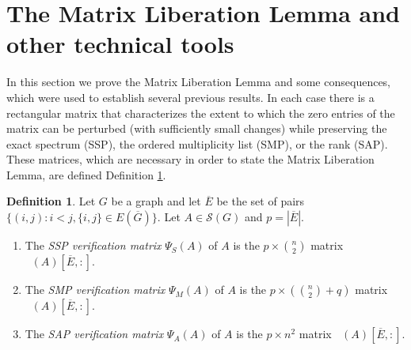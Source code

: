 \documentclass[11pt]{article}
\def\red{\color{red}}
\theoremstyle{definition}
\theoremstyle{definition}
\newtheorem{defn}[thm]{Definition}
\theoremstyle{definition}
\DeclareMathOperator{\TSS}{TS_S}
\DeclareMathOperator{\TSM}{TS_M}
\DeclareMathOperator{\TSA}{TS_A}
\newcommand{\Ec}{\overline{E}}
\newcommand{\verA}{\Psi_A}
\newcommand{\verM}{\Psi_M}
\newcommand{\verS}{\Psi_S}
\newcommand{\Gc}{\overline{G}}
\newcommand{\x}{\times}
\newcommand{\mptn}{\mathcal{S}} %
\newcommand{\vect}{\operatorname{vec}}
\begin{document}
\section{The Matrix Liberation Lemma and other technical tools}\label{sMLL}
In this section we prove the Matrix Liberation Lemma and some consequences, which were used to establish several previous results.  In each case there is a rectangular matrix that characterizes the extent to which   the {zero} entries of the matrix can be perturbed  (with sufficiently small changes) 
while preserving the exact spectrum (SSP),  the ordered multiplicity list  (SMP), or  the rank (SAP).  These matrices, which are necessary in order to state the Matrix Liberation Lemma, are defined Definition \ref{vermtxdef}.  %

\begin{defn}\label{vermtxdef}  Let $G$ be a graph and let $\overline{E}$ be the set of pairs $\{(i,j):i<j,\{i,j\}\in E(\overline{G})\}$.  Let $A\in\mptn(G)$ and $p=|\overline{E}|$.  
\begin{enumerate}
\item The {\em SSP verification matrix} $\verS(A)$ of $A$ is the $p\times\binom{n}{2}$ matrix $\TSS(A)[\Ec,:]$.
\item The {\em SMP verification matrix} $\verM(A)$ of $A$ is the $p\times\left(\binom{n}{2}+q\right)$ matrix $\TSM(A)[\Ec,:]$.
\item The {\em SAP verification matrix} $\verA(A)$ of $A$ is the $p\times n^2$ matrix $\TSA(A)[\Ec,:]$.
\end{enumerate}
\end{defn}
\end{document}
